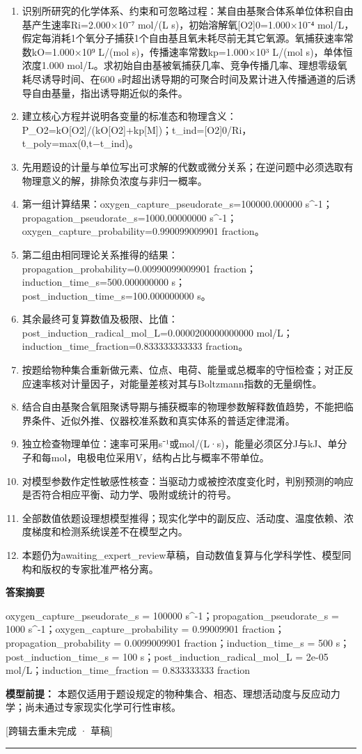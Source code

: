 \documentclass[UTF8,11pt,a4paper]{ctexart}
\begin{document}
\begin{enumerate}
\item 识别所研究的化学体系、约束和可忽略过程：某自由基聚合体系单位体积自由基产生速率Ri=2.000×10⁻⁷ mol/(L s)，初始溶解氧[O2]0=1.000×10⁻⁴ mol/L，假定每消耗1个氧分子捕获1个自由基且氧未耗尽前无其它氧源。氧捕获速率常数kO=1.000×10⁹ L/(mol s)，传播速率常数kp=1.000×10³ L/(mol s)，单体恒浓度1.000 mol/L。求初始自由基被氧捕获几率、竞争传播几率、理想零级氧耗尽诱导时间、在600 s时超出诱导期的可聚合时间及累计进入传播通道的后诱导自由基量，指出诱导期近似的条件。
\item 建立核心方程并说明各变量的标准态和物理含义：P\_O2=kO[O2]/(kO[O2]+kp[M])；t\_ind=[O2]0/Ri，t\_poly=max(0,t−t\_ind)。
\item 先用题设的计量与单位写出可求解的代数或微分关系；在逆问题中必须选取有物理意义的解，排除负浓度与非归一概率。
\item 第一组计算结果：oxygen\_capture\_pseudorate\_s=100000.000000 s\textasciicircum{}-1；propagation\_pseudorate\_s=1000.00000000 s\textasciicircum{}-1；oxygen\_capture\_probability=0.990099009901 fraction。
\item 第二组由相同理论关系推得的结果：propagation\_probability=0.00990099009901 fraction；induction\_time\_s=500.000000000 s；post\_induction\_time\_s=100.000000000 s。
\item 其余最终可复算数值及极限、比值：post\_induction\_radical\_mol\_L=0.0000200000000000 mol/L；induction\_time\_fraction=0.833333333333 fraction。
\item 按题给物种集合重新做元素、位点、电荷、能量或总概率的守恒检查；对正反应速率核对计量因子，对能量差核对其与Boltzmann指数的无量纲性。
\item 结合自由基聚合氧阻聚诱导期与捕获概率的物理参数解释数值趋势，不能把临界条件、近似外推、仪器校准系数和真实体系的普适定律混淆。
\item 独立检查物理单位：速率可采用s⁻¹或mol/(L·s)，能量必须区分J与kJ、单分子和每mol，电极电位采用V，结构占比与概率不带单位。
\item 对模型参数作定性敏感性核查：当驱动力或被控浓度变化时，判别预测的响应是否符合相应平衡、动力学、吸附或统计的符号。
\item 全部数值依题设理想模型推得；现实化学中的副反应、活动度、温度依赖、浓度梯度和检测系统误差不在模型之内。
\item 本题仍为awaiting\_expert\_review草稿，自动数值复算与化学科学性、模型同构和版权的专家批准严格分离。
\end{enumerate}
\noindent\textbf{答案摘要}\par
oxygen\_capture\_pseudorate\_s = 100000 s\textasciicircum{}-1；propagation\_pseudorate\_s = 1000 s\textasciicircum{}-1；oxygen\_capture\_probability = 0.99009901 fraction；propagation\_probability = 0.0099009901 fraction；induction\_time\_s = 500 s；post\_induction\_time\_s = 100 s；post\_induction\_radical\_mol\_L = 2e-05 mol/L；induction\_time\_fraction = 0.833333333 fraction\par
\noindent\textbf{模型前提：}
本题仅适用于题设规定的物种集合、相态、理想活动度与反应动力学；尚未通过专家现实化学可行性审核。\par
\noindent\textcolor{red!65!black}{[跨辑去重未完成 · 草稿]} \par
\medskip\hrule\medskip
{}
\end{document}
